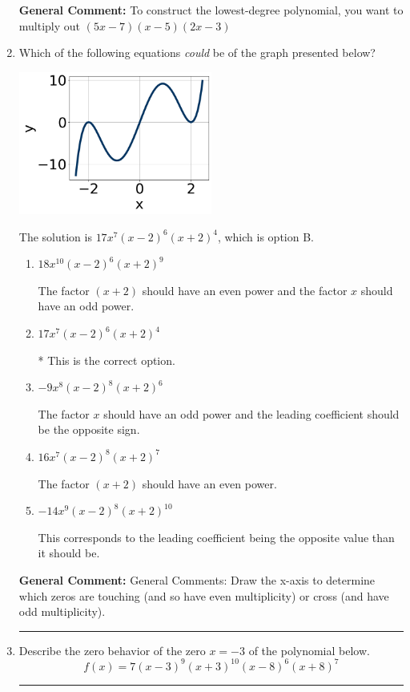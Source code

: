 \documentclass{extbook}[14pt]
\newcommand{\litem}[1]{\item #1

\rule{\textwidth}{0.4pt}}
\begin{document}
\begin{enumerate}
{\textbf{General Comment:} To construct the lowest-degree polynomial, you want to multiply out $(5x -7)(x -5)(2x -3)$
}
\litem{
Which of the following equations \textit{could} be of the graph presented below?

\begin{center}
    \includegraphics[width=0.5\textwidth]{../Figures/polyGraphToFunctionA.png}
\end{center}




The solution is \( 17x^{7} (x - 2)^{6} (x + 2)^{4} \), which is option B.\begin{enumerate}[label=\Alph*.]
\item \( 18x^{10} (x - 2)^{6} (x + 2)^{9} \)

The factor $(x + 2)$ should have an even power and the factor $x$ should have an odd power.
\item \( 17x^{7} (x - 2)^{6} (x + 2)^{4} \)

* This is the correct option.
\item \( -9x^{8} (x - 2)^{8} (x + 2)^{6} \)

The factor $x$ should have an odd power and the leading coefficient should be the opposite sign.
\item \( 16x^{7} (x - 2)^{8} (x + 2)^{7} \)

The factor $(x + 2)$ should have an even power.
\item \( -14x^{9} (x - 2)^{8} (x + 2)^{10} \)

This corresponds to the leading coefficient being the opposite value than it should be.
\end{enumerate}

\textbf{General Comment:} General Comments: Draw the x-axis to determine which zeros are touching (and so have even multiplicity) or cross (and have odd multiplicity).
}
\litem{
Describe the zero behavior of the zero $x = -3$ of the polynomial below.
\[ f(x) = 7(x - 3)^{9}(x + 3)^{10}(x - 8)^{6}(x + 8)^{7} \]

}
\end{enumerate}
\end{document}
